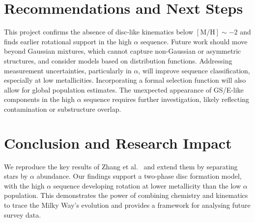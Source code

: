 \documentclass[a4paper,10pt]{article}
\begin{document}
\begin{multicols}{2}
\section*{Recommendations and Next Steps}

This project confirms the absence of disc-like kinematics below $\mathrm{[M/H]} \sim -2$ 
and finds earlier rotational support in the high $\alpha$ sequence. Future work should move 
beyond Gaussian mixtures, which cannot capture non-Gaussian or asymmetric structures, and 
consider models based on distribution functions. Addressing measurement uncertainties, 
particularly in $\alpha$, will improve sequence classification, especially 
at low metallicities. Incorporating a formal selection function will also allow for global 
population estimates. The unexpected appearance of GS/E-like components in the high $\alpha$ 
sequence requires further investigation, likely reflecting contamination or substructure overlap.

\section*{Conclusion and Research Impact}

We reproduce the key results of Zhang et al.~ \cite{zhang2024existencemetalpoordiscmilky} and 
extend them by separating stars by $\alpha$ abundance. Our findings support a two-phase disc 
formation model, with the high $\alpha$ sequence developing rotation at lower metallicity than 
the low $\alpha$ population. This demonstrates the power of combining chemistry and kinematics to 
trace the Milky Way’s evolution and provides a framework for analysing future survey data.













\end{multicols}
\end{document}
